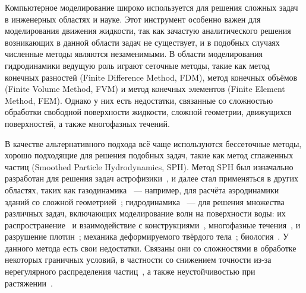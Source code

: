 
{\actuality} 

Компьютерное моделирование широко используется для решения сложных задач в инженерных областях и науке.
%
Этот инструмент особенно важен для моделирования движения жидкости,
так как зачастую аналитического решения возникающих в данной области задач не существует,
и в подобных случаях численные методы являются незаменимыми.
%
В области моделирования гидродинамики ведущую роль играют сеточные методы, такие как 
метод конечных разностей (Finite Difference Method, FDM), 
метод конечных объёмов (Finite Volume Method, FVM) и
метод конечных элементов (Finite Element Method, FEM).
%
Однако у них есть недостатки, связанные со сложностью обработки свободной поверхности жидкости, сложной геометрии, движущихся поверхностей, а также многофазных течений.


В качестве альтернативного подхода всё чаще используются бессеточные методы, 
хорошо подходящие для решения подобных задач, такие как метод сглаженных частиц (Smoothed Particle Hydrodynamics, SPH).
%
Метод SPH был изначально разработан для решения задач астрофизики~\cite{Lucy1977,Monaghan1977,Monaghan1985_astro}, 
и далее стал применяться в других областях, таких как 
газодинамика~\cite{Monaghan1983,Monaghan1985,Monaghan1988,Monaghan1989,Monaghan1992,Monaghan2005}
--- например, для расчёта аэродинамики зданий со сложной геометрией~\cite{Khopeskov2019};
гидродинамика~\cite{Monaghan1994,Monaghan1999,Monaghan2015}
--- для решения множества различных задач, включающих моделирование волн на поверхности воды: 
их распространение~\cite{Dalrymple2001,Federico2012,Dao2013,Dominguez2019,Trimulyono2019} 
и взаимодействие с конструкциями~\cite{Li2004,Ni2013,Lu2021},
многофазные течения~\cite{Monaghan1995,Dao2011,Monaghan2015_Kwon,Wang2016,Wu2017},
и разрушение плотин~\cite{Afanasiev2009,Dal2017,Luo2017};
механика деформируемого твёрдого тела~\cite{Libersky1991,Libersky1993,Gray2001,Gerasimov2010};
биология~\cite{Ye2019}.
%
У данного метода есть свои недостатки. 
Связаны они со сложностями в обработке некоторых граничных условий, 
в частности со снижением точности из-за нерегулярного распределения частиц~\cite{Chen2000,Liu2006,Korzilius2017}, 
а также неустойчивостью при растяжении~\cite{Swegle1995,Monaghan2000}.


